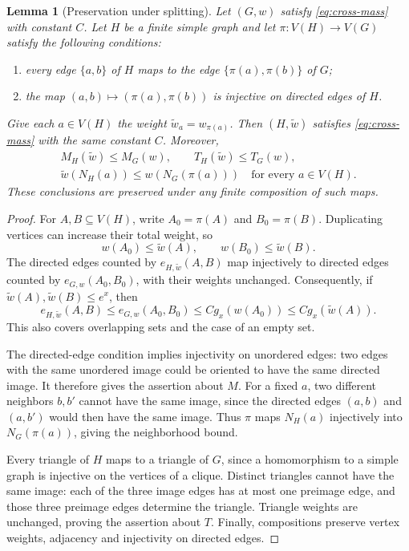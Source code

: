 \documentclass[11pt]{article}
\newtheorem{lemma}[theorem]{Lemma}
\theoremstyle{definition}
\theoremstyle{remark}
\numberwithin{equation}{section}
\begin{document}
\begin{lemma}[Preservation under splitting]
\label{lem:invariant-preservation}
Let $(G,w)$ satisfy \eqref{eq:cross-mass} with constant $C$.
Let $H$ be a finite simple graph and let $\pi:V(H)\to V(G)$ satisfy
the following conditions:
\begin{enumerate}
 \item every edge $\{a,b\}$ of $H$ maps to the edge
       $\{\pi(a),\pi(b)\}$ of $G$;
 \item the map $(a,b)\mapsto(\pi(a),\pi(b))$ is injective on
       directed edges of $H$.
\end{enumerate}
Give each $a\in V(H)$ the weight $\widetilde w_a=w_{\pi(a)}$.
Then $(H,\widetilde w)$ satisfies
\eqref{eq:cross-mass} with the same constant $C$.  Moreover,
\begin{gather*}
 M_H(\widetilde w)\le M_G(w),\qquad
 T_H(\widetilde w)\le T_G(w),\\
 \widetilde w(N_H(a))\le w(N_G(\pi(a)))
 \quad\text{for every }a\in V(H).
\end{gather*}
These conclusions are preserved under any finite composition of such maps.
\end{lemma}

\begin{proof}
For $A,B\subseteq V(H)$, write $A_0=\pi(A)$ and $B_0=\pi(B)$.
Duplicating vertices can increase their total weight, so
\[
 w(A_0)\le\widetilde w(A),\qquad
 w(B_0)\le\widetilde w(B).
\]
The directed edges counted by $e_{H,\widetilde w}(A,B)$ map injectively
to directed edges counted by $e_{G,w}(A_0,B_0)$, with their weights
unchanged.  Consequently, if $\widetilde w(A),\widetilde w(B)\le e^x$,
then
\[
 e_{H,\widetilde w}(A,B)
 \le e_{G,w}(A_0,B_0)
 \le Cg_x(w(A_0))
 \le Cg_x(\widetilde w(A)).
\]
This also covers overlapping sets and the case of an empty set.

The directed-edge condition implies injectivity on unordered edges:
two edges with the same unordered image could be oriented to have the
same directed image.  It therefore gives the assertion about $M$.
For a fixed $a$, two different neighbors $b,b'$ cannot have the same
image, since the directed edges $(a,b)$ and $(a,b')$ would then have the
same image.  Thus $\pi$ maps $N_H(a)$ injectively into $N_G(\pi(a))$,
giving the neighborhood bound.

Every triangle of $H$ maps to a triangle of $G$, since a homomorphism
to a simple graph is injective on the vertices of a clique.  Distinct
triangles cannot have the same image: each of the three image edges
has at most one preimage edge, and those three preimage edges determine
the triangle.  Triangle weights are unchanged, proving the assertion
about $T$.  Finally, compositions preserve vertex weights,
adjacency and injectivity on directed edges.
\end{proof}
\end{document}
